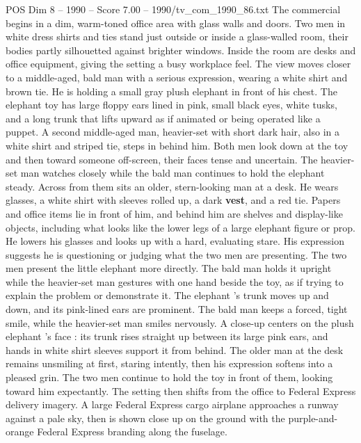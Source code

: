 \begin{textsample}{POS Dim 8 – 1990 – Score 7.00 – 1990/tv\_com\_1990\_86.txt}  \label{ex:f8_pos_063}
The commercial begins in a dim, warm-toned office area with glass walls and doors.
Two men in white dress shirts and ties stand just outside or inside a glass-walled room, their bodies partly silhouetted against brighter windows.
Inside the room are desks and office equipment, giving the setting a busy workplace feel.
The view moves closer to a middle-aged, bald man with a serious expression, wearing a white shirt and brown tie.
He is holding a small gray plush elephant in front of his chest.
The elephant toy has large floppy ears lined in pink, small black eyes, white tusks, and a long trunk that lifts upward as if animated or being operated like a puppet.
A second middle-aged man, heavier-set with short dark hair, also in a white shirt and striped tie, steps in behind him.
Both men look down at the toy and then toward someone off-screen, their faces tense and uncertain.
The heavier-set man watches closely while the bald man continues to hold the elephant steady.
Across from them sits an older, stern-looking man at a desk.
He wears glasses, a white shirt with sleeves rolled up, a dark \textbf{vest}, and a red tie.
Papers and office items lie in front of him, and behind him are shelves and display-like objects, including what looks like the lower legs of a large elephant figure or prop.
He lowers his glasses and looks up with a hard, evaluating stare.
His expression suggests he is questioning or judging what the two men are presenting.
The two men present the little elephant more directly.
The bald man holds it upright while the heavier-set man gestures with one hand beside the toy, as if trying to explain the problem or demonstrate it.
The elephant ’s trunk moves up and down, and its pink-lined ears are prominent.
The bald man keeps a forced, tight smile, while the heavier-set man smiles nervously.
A close-up centers on the plush elephant ’s face : its trunk rises straight up between its large pink ears, and hands in white shirt sleeves support it from behind.
The older man at the desk remains unsmiling at first, staring intently, then his expression softens into a pleased grin.
The two men continue to hold the toy in front of them, looking toward him expectantly.
The setting then shifts from the office to Federal Express delivery imagery.
A large Federal Express cargo airplane approaches a runway against a pale sky, then is shown close up on the ground with the purple-and-orange Federal Express branding along the fuselage.

\end{textsample}
